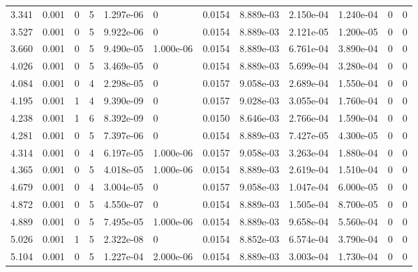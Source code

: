 \documentclass[preview]{standalone}
\begin{document}
{{\begin{tabular}{L{1.2cm}C{1.2cm} C{0.3cm}C{0.5cm} C{1.4cm}C{1.4cm} C{1.4cm}C{1.4cm} C{1.6cm}C{1.6cm} C{1.6cm}C{1.6cm}}
  3.341  &  0.001  & 0     &  5 &  1.297e-06  & 0  &  0.0154&   8.889e-03& 2.150e-04 & 1.240e-04   &  0 & 0  \\ 
  3.527  &  0.001  & 0     &  5 &  9.922e-06  & 0  &  0.0154&   8.889e-03& 2.121e-05 & 1.200e-05   &  0 & 0  \\ 
  3.660  &  0.001  & 0     &  5 &  9.490e-05  & 1.000e-06  &  0.0154&   8.889e-03& 6.761e-04 & 3.890e-04   &  0 & 0  \\ 
  4.026  &  0.001  & 0     &  5 &  3.469e-05  & 0  &  0.0154&   8.889e-03& 5.699e-04 & 3.280e-04   &  0 & 0  \\ 
  4.084  &  0.001  & 0     &  4 &  2.298e-05  & 0  &  0.0157&   9.058e-03& 2.689e-04 & 1.550e-04   &  0 & 0  \\ 
  4.195  &  0.001  & 1     &  4 &  9.390e-09  & 0  &  0.0157&   9.028e-03& 3.055e-04 & 1.760e-04   &  0 & 0  \\ 
  4.238  &  0.001  & 1     &  6 &  8.392e-09  & 0  &  0.0150&   8.646e-03& 2.766e-04 & 1.590e-04   &  0 & 0  \\ 
  4.281  &  0.001  & 0     &  5 &  7.397e-06  & 0  &  0.0154&   8.889e-03& 7.427e-05 & 4.300e-05   &  0 & 0  \\ 
  4.314  &  0.001  & 0     &  4 &  6.197e-05  & 1.000e-06  &  0.0157&   9.058e-03& 3.263e-04 & 1.880e-04   &  0 & 0  \\ 
  4.365  &  0.001  & 0     &  5 &  4.018e-05  & 1.000e-06  &  0.0154&   8.889e-03& 2.619e-04 & 1.510e-04   &  0 & 0  \\ 
  4.679  &  0.001  & 0     &  4 &  3.004e-05  & 0  &  0.0157&   9.058e-03& 1.047e-04 & 6.000e-05   &  0 & 0  \\ 
  4.872  &  0.001  & 0     &  5 &  4.550e-07  & 0  &  0.0154&   8.889e-03& 1.505e-04 & 8.700e-05   &  0 & 0  \\ 
  4.889  &  0.001  & 0     &  5 &  7.495e-05  & 1.000e-06  &  0.0154&   8.889e-03& 9.658e-04 & 5.560e-04   &  0 & 0  \\ 
  5.026  &  0.001  & 1     &  5 &  2.322e-08  & 0  &  0.0154&   8.852e-03& 6.574e-04 & 3.790e-04   &  0 & 0  \\ 
  5.104  &  0.001  & 0     &  5 &  1.227e-04  & 2.000e-06  &  0.0154&   8.889e-03& 3.003e-04 & 1.730e-04   &  0 & 0  \\ 
\hline 
\end{tabular} 

}}
\end{document}
